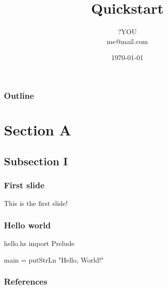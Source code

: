 \documentclass{beamer}
\title{Quickstart}
\author[?YOU]{?YOU \\ me@mail.com}
\date{\today}
\begin{document}
\begin{frame}
\titlepage
\end{frame}

\contentpagetrue
\begin{frame}
\frametitle{Outline}
\tableofcontents
\end{frame}

\section{Section A}
\subsection{Subsection I}
\contentpagefalse
\frame{\sectionpage}

\contentpagetrue
\begin{frame}
  \frametitle{First slide}
  This is the first slide!
\end{frame}

\begin{frame}[fragile]
  \frametitle{Hello world}
  \begin{Code}[Haskell]{hello.hs}
import Prelude

main = putStrLn "Hello, World!"
  \end{Code}
\end{frame}

\nocite{*}
\begin{frame}[allowframebreaks]
  \frametitle{References}
  \printbibliography
\end{frame}
\end{document}
